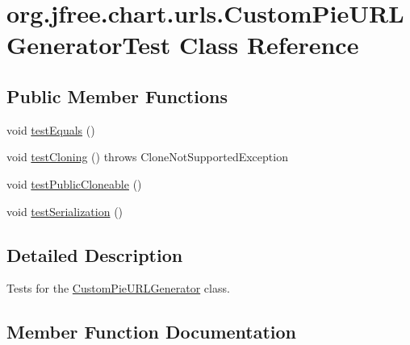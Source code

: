 \hypertarget{classorg_1_1jfree_1_1chart_1_1urls_1_1_custom_pie_u_r_l_generator_test}{}\section{org.\+jfree.\+chart.\+urls.\+Custom\+Pie\+U\+R\+L\+Generator\+Test Class Reference}
\label{classorg_1_1jfree_1_1chart_1_1urls_1_1_custom_pie_u_r_l_generator_test}
\subsection*{Public Member Functions}
\begin{DoxyCompactItemize}
\item 
void \mbox{\hyperlink{classorg_1_1jfree_1_1chart_1_1urls_1_1_custom_pie_u_r_l_generator_test_a874cac9c4726e5c039a19656686e17b6}{test\+Equals}} ()
\item 
void \mbox{\hyperlink{classorg_1_1jfree_1_1chart_1_1urls_1_1_custom_pie_u_r_l_generator_test_a4a2c72c85aff57f33103f99427f75204}{test\+Cloning}} ()  throws Clone\+Not\+Supported\+Exception 
\item 
void \mbox{\hyperlink{classorg_1_1jfree_1_1chart_1_1urls_1_1_custom_pie_u_r_l_generator_test_a213ebe72cacd8850ebbf3257cf765093}{test\+Public\+Cloneable}} ()
\item 
void \mbox{\hyperlink{classorg_1_1jfree_1_1chart_1_1urls_1_1_custom_pie_u_r_l_generator_test_a225d765c3dcedbb868a41df11513a867}{test\+Serialization}} ()
\end{DoxyCompactItemize}


\subsection{Detailed Description}
Tests for the \mbox{\hyperlink{classorg_1_1jfree_1_1chart_1_1urls_1_1_custom_pie_u_r_l_generator}{Custom\+Pie\+U\+R\+L\+Generator}} class. 

\subsection{Member Function Documentation}
\mbox{\label{classorg_1_1jfree_1_1chart_1_1urls_1_1_custom_pie_u_r_l_generator_test_a4a2c72c85aff57f33103f99427f75204}} 
